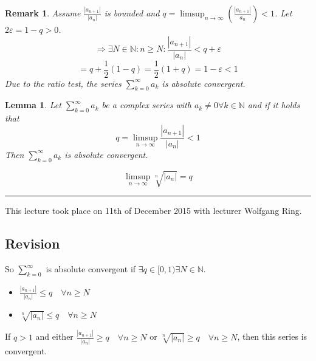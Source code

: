 \documentclass[a4paper,landscape,twocolumn]{article}
\newtheorem{rem}{Remark}
\newtheorem{lemma}{Lemma}
\newcommand\abs[1]{\left|#1\right|}
\newcommand\meta[3]{\hrule{} This #1 took place on #2 with lecturer #3.\par}
\begin{document}
\begin{rem}
  Assume $\frac{\abs{a_{n+1}}}{\abs{a_n}}$ is bounded and $q = \limsup_{n\to\infty}\left(\frac{\abs{a_{n+1}}}{a_n}\right) < 1$.
  Let $2 \varepsilon = 1 - q > 0$.
  \[ \Rightarrow \exists N \in \mathbb N: n \geq N: \frac{\abs{a_{n+1}}}{\abs{a_n}} < q + \varepsilon \]
  \[ = q + \frac12 \left(1 - q\right) = \frac12 (1 + q) = 1 - \varepsilon < 1 \]
  Due to the ratio test, the series $\sum_{k=0}^\infty a_k$ is absolute convergent.
\end{rem}

\begin{lemma}
  Let $\sum_{k=0}^\infty a_k$ be a complex series with $a_k \neq 0 \forall k \in \mathbb N$
  and if it holds that
  \[ q = \limsup_{n\to\infty} \frac{\abs{a_{n+1}}}{\abs{a_n}} < 1 \]
  Then $\sum_{k=0}^\infty a_k$ is absolute convergent.

  \[ \limsup_{n\to\infty} \sqrt[n]{\abs{a_n}} = q \]
\end{lemma}

\meta{lecture}{11th of December 2015}{Wolfgang Ring}

\subsection{Revision}
%
So $\sum_{k=0}^\infty$ is absolute convergent if $\exists q \in [0,1) \exists N \in \mathbb N$.

\begin{itemize}
  \item $\frac{\abs{a_{n+1}}}{\abs{a_n}} \leq q \quad\forall n \geq N$
  \item $\sqrt[n]{\abs{a_n}} \leq q \quad \forall n \geq N$
\end{itemize}

If $q > 1$ and either $\frac{\abs{a_{n+1}}}{\abs{a_n}} \geq q \quad \forall n \geq N$
or $\sqrt[n]{\abs{a_n}} \geq q \quad\forall n \geq N$, then this series is convergent.
\end{document}
